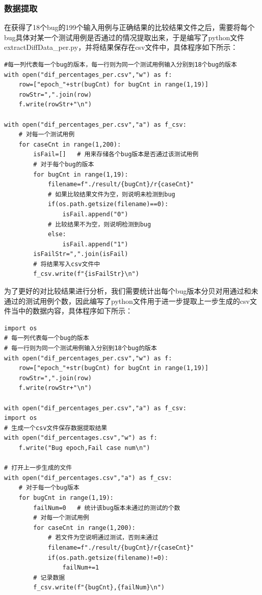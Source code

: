 \documentclass[12pt, a4paper, oneside,bibend=bibtex]{ctexart}
\begin{document}
\subsubsection{数据提取}
在获得了18个bug的199个输入用例与正确结果的比较结果文件之后，需要将每个bug具体对某一个测试用例是否通过的情况提取出来，于是编写了python文件extractDiffData\_per.py，并将结果保存在csv文件中，具体程序如下所示：

\begin{lstlisting}[caption={}]
#每一列代表每一个bug的版本，每一行则为同一个测试用例输入分别到18个bug的版本
with open("dif_percentages_per.csv","w") as f:
    row=["epoch_"+str(bugCnt) for bugCnt in range(1,19)]
    rowStr=",".join(row)
    f.write(rowStr+"\n")

with open("dif_percentages_per.csv","a") as f_csv:
    # 对每一个测试用例
    for caseCnt in range(1,200):
        isFail=[]   # 用来存储各个bug版本是否通过该测试用例
        # 对于每个bug的版本
        for bugCnt in range(1,19):
            filename=f"./result/{bugCnt}/r{caseCnt}"
            # 如果比较结果文件为空，则说明未检测到bug
            if(os.path.getsize(filename)==0):
                isFail.append("0")
            # 比较结果不为空，则说明检测到bug
            else:
                isFail.append("1")
        isFailStr=",".join(isFail)  
        # 将结果写入csv文件中
        f_csv.write(f"{isFailStr}\n")
\end{lstlisting}

为了更好的对比较结果进行分析，我们需要统计出每个bug版本分贝对用通过和未通过的测试用例个数，因此编写了python文件用于进一步提取上一步生成的csv文件当中的数据内容，具体程序如下所示：

\begin{lstlisting}[caption={}]
import os
# 每一列代表每一个bug的版本
# 每一行则为同一个测试用例输入分别到18个bug的版本
with open("dif_percentages_per.csv","w") as f:
    row=["epoch_"+str(bugCnt) for bugCnt in range(1,19)]
    rowStr=",".join(row)
    f.write(rowStr+"\n")

with open("dif_percentages_per.csv","a") as f_csv:
import os
# 生成一个csv文件保存数据提取结果
with open("dif_percentages.csv","w") as f:
    f.write("Bug epoch,Fail case num\n")

# 打开上一步生成的文件
with open("dif_percentages.csv","a") as f_csv:
    # 对于每一个bug版本
    for bugCnt in range(1,19):
        failNum=0   # 统计该bug版本未通过的测试的个数
        # 对每一个测试用例
        for caseCnt in range(1,200):
            # 若文件为空说明通过测试，否则未通过
            filename=f"./result/{bugCnt}/r{caseCnt}"
            if(os.path.getsize(filename)!=0):
                failNum+=1
        # 记录数据         
        f_csv.write(f"{bugCnt},{failNum}\n")
\end{lstlisting}
\end{document}
